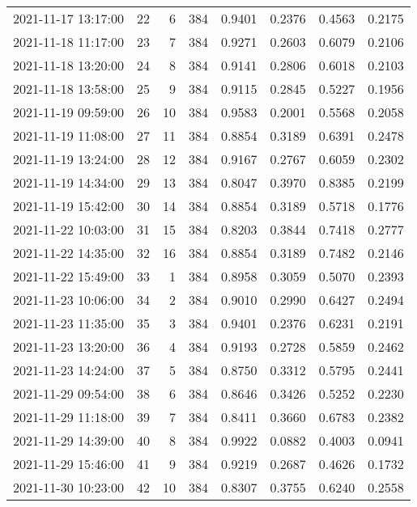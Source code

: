 \begin{longtable}{lrrrrrrr}
2021-11-17 13:17:00 &   22 &    6 &    384 &   0.9401 & 0.2376 & 0.4563 & 0.2175 \\
2021-11-18 11:17:00 &   23 &    7 &    384 &   0.9271 & 0.2603 & 0.6079 & 0.2106 \\
2021-11-18 13:20:00 &   24 &    8 &    384 &   0.9141 & 0.2806 & 0.6018 & 0.2103 \\
2021-11-18 13:58:00 &   25 &    9 &    384 &   0.9115 & 0.2845 & 0.5227 & 0.1956 \\
2021-11-19 09:59:00 &   26 &   10 &    384 &   0.9583 & 0.2001 & 0.5568 & 0.2058 \\
2021-11-19 11:08:00 &   27 &   11 &    384 &   0.8854 & 0.3189 & 0.6391 & 0.2478 \\
2021-11-19 13:24:00 &   28 &   12 &    384 &   0.9167 & 0.2767 & 0.6059 & 0.2302 \\
2021-11-19 14:34:00 &   29 &   13 &    384 &   0.8047 & 0.3970 & 0.8385 & 0.2199 \\
2021-11-19 15:42:00 &   30 &   14 &    384 &   0.8854 & 0.3189 & 0.5718 & 0.1776 \\
2021-11-22 10:03:00 &   31 &   15 &    384 &   0.8203 & 0.3844 & 0.7418 & 0.2777 \\
2021-11-22 14:35:00 &   32 &   16 &    384 &   0.8854 & 0.3189 & 0.7482 & 0.2146 \\
2021-11-22 15:49:00 &   33 &    1 &    384 &   0.8958 & 0.3059 & 0.5070 & 0.2393 \\
2021-11-23 10:06:00 &   34 &    2 &    384 &   0.9010 & 0.2990 & 0.6427 & 0.2494 \\
2021-11-23 11:35:00 &   35 &    3 &    384 &   0.9401 & 0.2376 & 0.6231 & 0.2191 \\
2021-11-23 13:20:00 &   36 &    4 &    384 &   0.9193 & 0.2728 & 0.5859 & 0.2462 \\
2021-11-23 14:24:00 &   37 &    5 &    384 &   0.8750 & 0.3312 & 0.5795 & 0.2441 \\
2021-11-29 09:54:00 &   38 &    6 &    384 &   0.8646 & 0.3426 & 0.5252 & 0.2230 \\
2021-11-29 11:18:00 &   39 &    7 &    384 &   0.8411 & 0.3660 & 0.6783 & 0.2382 \\
2021-11-29 14:39:00 &   40 &    8 &    384 &   0.9922 & 0.0882 & 0.4003 & 0.0941 \\
2021-11-29 15:46:00 &   41 &    9 &    384 &   0.9219 & 0.2687 & 0.4626 & 0.1732 \\
2021-11-30 10:23:00 &   42 &   10 &    384 &   0.8307 & 0.3755 & 0.6240 & 0.2558 \\

\end{longtable}
